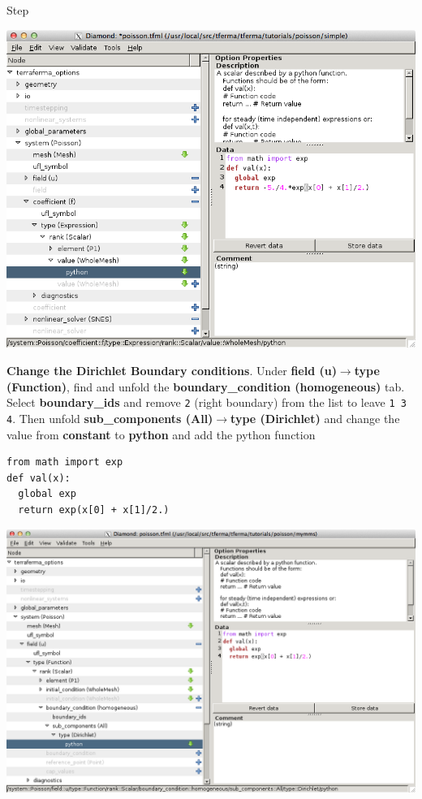 \begin{steps}{Step}
\begin{center}
\includegraphics[width=\diamondwidth]{figures/screendumps/diamond_poisson_mms_f_value.png}
  \end{center}
\item \textbf{Change the Dirichlet Boundary conditions}.  Under \textbf{field (u)}$\rightarrow$\textbf{type (Function)}, find and unfold the \textbf{boundary\_condition (homogeneous)} tab.  Select \textbf{boundary\_ids} and remove \texttt{2} (right boundary) from the list to leave \texttt{1 3 4}.  Then unfold \textbf{sub\_components (All)}$\rightarrow$\textbf{type (Dirichlet)} and change the value from \textbf{constant} to \textbf{python} and add the python function
\begin{lstlisting}[style=python]
from math import exp
def val(x):
  global exp
  return exp(x[0] + x[1]/2.)    
\end{lstlisting}
\begin{center}
\includegraphics[width=\diamondwidth]{figures/screendumps/diamond_poisson_mms_bcs.png}

\end{center}
\end{steps}
